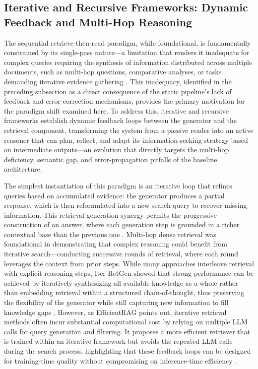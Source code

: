 \documentclass[11pt,a4paper]{article}
\begin{document}
\subsection{Iterative and Recursive Frameworks: Dynamic Feedback and Multi-Hop Reasoning}


The sequential retrieve-then-read paradigm, while foundational, is fundamentally constrained by its single-pass nature---a limitation that renders it inadequate for complex queries requiring the synthesis of information distributed across multiple documents, such as multi-hop questions, comparative analyses, or tasks demanding iterative evidence gathering \cite{arxiv:2404.10981v1}. This inadequacy, identified in the preceding subsection as a direct consequence of the static pipeline's lack of feedback and error-correction mechanisms, provides the primary motivation for the paradigm shift examined here. To address this, iterative and recursive frameworks establish dynamic feedback loops between the generator and the retrieval component, transforming the system from a passive reader into an active reasoner that can plan, reflect, and adapt its information-seeking strategy based on intermediate outputs---an evolution that directly targets the multi-hop deficiency, semantic gap, and error-propagation pitfalls of the baseline architecture.

The simplest instantiation of this paradigm is an iterative loop that refines queries based on accumulated evidence: the generator produces a partial response, which is then reformulated into a new search query to recover missing information. This retrieval-generation synergy permits the progressive construction of an answer, where each generation step is grounded in a richer contextual base than the previous one \cite{arxiv:2305.15294v2}. Multi-hop dense retrieval \cite{arxiv:2009.12756v2} was foundational in demonstrating that complex reasoning could benefit from iterative search---conducting successive rounds of retrieval, where each round leverages the context from prior steps. While many approaches interleave retrieval with explicit reasoning steps, Iter-RetGen showed that strong performance can be achieved by iteratively synthesizing all available knowledge as a whole rather than embedding retrieval within a structured chain-of-thought, thus preserving the flexibility of the generator while still capturing new information to fill knowledge gaps \cite{arxiv:2305.15294v2}. However, as EfficientRAG points out, iterative retrieval methods often incur substantial computational cost by relying on multiple LLM calls for query generation and filtering. It proposes a more efficient retriever that is trained within an iterative framework but avoids the repeated LLM calls during the search process, highlighting that these feedback loops can be designed for training-time quality without compromising on inference-time efficiency \cite{arxiv:2408.04259v1}.
\end{document}
